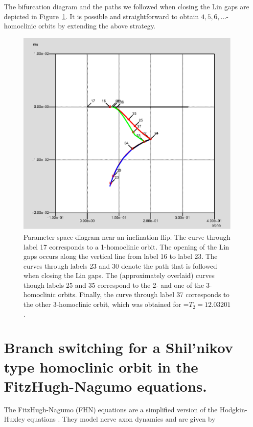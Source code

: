 The bifurcation diagram and the paths we followed when closing the Lin
gaps are depicted in Figure~\ref{parspace}. It is possible and
straightforward to obtain $4, 5, 6, \dots$-homoclinic orbits by 
extending the above strategy.
\begin{figure}[htb]
\begin{center}
\includegraphics[scale=0.5]{include/parspace.eps}
\caption{Parameter space diagram near an inclination flip. 
The curve
through label 17 corresponds to a 1-homoclinic orbit. 
The opening of the Lin gaps occurs along the vertical line from
label 16 to label 23. The curves
through labels 23 and 30 denote the path that is followed when
closing the Lin gaps. The (approximately overlaid)
curves though labels 25 and 35 correspond to the 
2- and one of the 3-homoclinic orbits.
Finally, the curve through label 37 corresponds to the other
3-homoclinic orbit, which was obtained for =$T_2=12.03201$.}
\label{parspace}
\end{center}
\end{figure}

\section{ Branch switching for a Shil'nikov type homoclinic orbit in
the FitzHugh-Nagumo equations.}

The FitzHugh-Nagumo (FHN) equations \cite{FitzH:61,NaArYo:62} 
are a simplified version of the
Hodgkin-Huxley equations \cite{HoHu:52}. 
They model nerve axon dynamics and are given by

